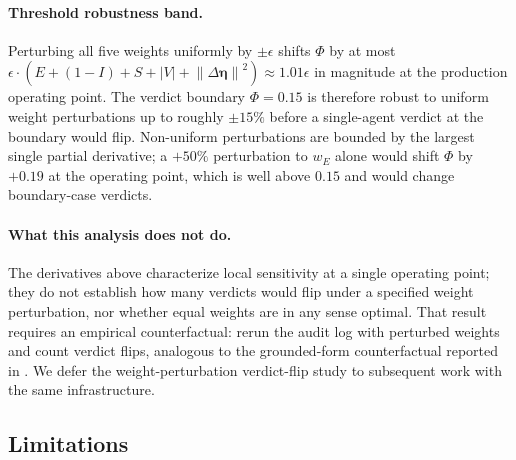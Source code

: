 \documentclass[11pt,twocolumn]{article}
\newcommand{\norm}[1]{\left\lVert #1 \right\rVert}
\newcommand{\abs}[1]{\left| #1 \right|}
\newcommand{\deta}{\ensuremath{\Delta\bm{\eta}}}
\begin{document}
\paragraph{Threshold robustness band.}
Perturbing all five weights uniformly by $\pm \epsilon$ shifts
$\Phi$ by at most
$\epsilon \cdot (E + (1-I) + S + \abs{V} + \norm{\deta}^2)
\approx 1.01\epsilon$ in magnitude at the production operating
point. The verdict boundary $\Phi = 0.15$ is therefore robust to
uniform weight perturbations up to roughly $\pm 15\%$ before a
single-agent verdict at the boundary would flip. Non-uniform
perturbations are bounded by the largest single partial
derivative; a $+50\%$ perturbation to $w_E$ alone would shift
$\Phi$ by $+0.19$ at the operating point, which is well above
$0.15$ and would change boundary-case verdicts.

\paragraph{What this analysis does not do.}
The derivatives above characterize local sensitivity at a single
operating point; they do not establish how many verdicts would
flip under a specified weight perturbation, nor whether equal
weights are in any sense optimal. That result requires an
empirical counterfactual: rerun the audit log with perturbed
weights and count verdict flips, analogous to the grounded-form
counterfactual reported in . We defer the
weight-perturbation verdict-flip study to subsequent work with
the same infrastructure.

\subsection{Limitations}
\end{document}
